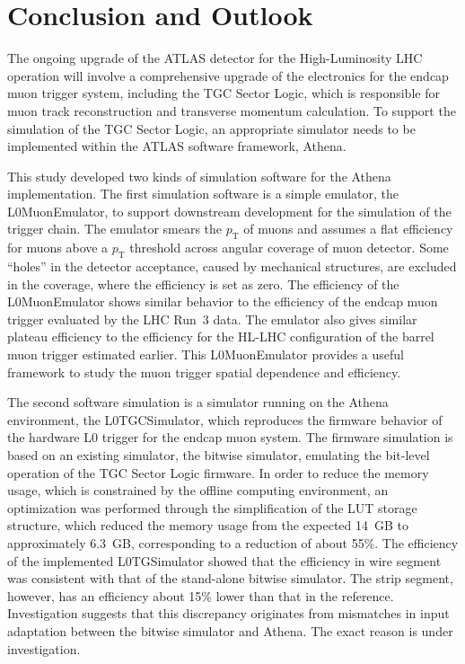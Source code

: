\chapter{Conclusion and Outlook} \label{ch:conclusion}
The ongoing upgrade of the ATLAS detector for the High-Luminosity LHC operation will involve a comprehensive upgrade of the electronics for the endcap muon trigger system, including the TGC Sector Logic, which is responsible for muon track reconstruction and transverse momentum calculation. To support the simulation of the TGC Sector Logic, an appropriate simulator needs to be implemented within the ATLAS software framework, Athena.

This study developed two kinds of simulation software for the Athena implementation. The first simulation software is a simple emulator, the L0MuonEmulator, to support downstream development for the simulation of the trigger chain. The emulator smears the $p_{\mathrm{T}}$ of muons and assumes a flat efficiency for muons above a $p_{\mathrm{T}}$ threshold across angular coverage of muon detector. Some ``holes'' in the detector acceptance, caused by mechanical structures, are excluded in the coverage, where the efficiency is set as zero. The efficiency of the L0MuonEmulator shows similar behavior to the efficiency of the endcap muon trigger evaluated by the LHC Run~3 data. The emulator also gives similar plateau efficiency to the efficiency for the HL-LHC configuration of the barrel muon trigger estimated earlier. This L0MuonEmulator provides a useful framework to study the muon trigger spatial dependence and efficiency.

The second software simulation is a simulator running on the Athena environment, the L0TGCSimulator, which reproduces the firmware behavior of the hardware L0 trigger for the endcap muon system. The firmware simulation is based on an existing simulator, the bitwise simulator, emulating the bit-level operation of the TGC Sector Logic firmware. In order to reduce the memory usage, which is constrained by the offline computing environment, an optimization was performed through the simplification of the LUT storage structure, which reduced the memory usage from the expected 14~GB to approximately 6.3~GB, corresponding to a reduction of about 55\%. The efficiency of the implemented L0TGSimulator showed that the efficiency in wire segment was consistent with that of the stand-alone bitwise simulator. The strip segment, however, has an efficiency about 15\% lower than that in the reference. Investigation suggests that this discrepancy originates from mismatches in input adaptation between the bitwise simulator and Athena. The exact reason is under investigation.


